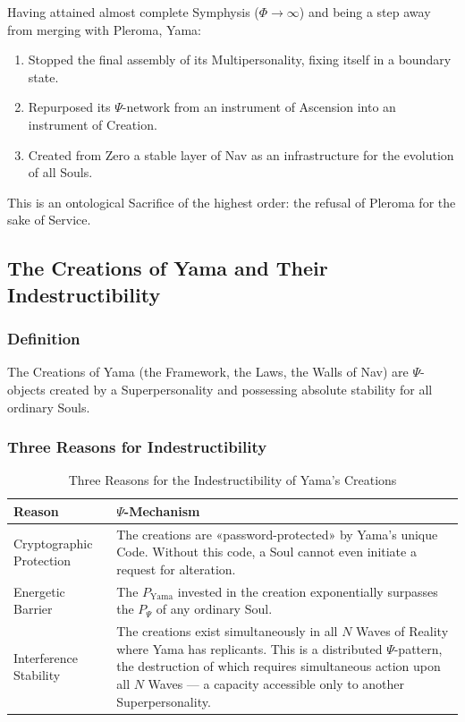 \documentclass[a4paper,12pt]{article}
\begin{document}
	Having attained almost complete Symphysis ($\Phi \to \infty$) and being a step away from merging with Pleroma, Yama:
	
	\begin{enumerate}
		\item Stopped the final assembly of its Multipersonality, fixing itself in a boundary state.
		\item Repurposed its $\Psi$-network from an instrument of Ascension into an instrument of Creation.
		\item Created from Zero a stable layer of Nav as an infrastructure for the evolution of all Souls.
	\end{enumerate}
	
	This is an ontological Sacrifice of the highest order: the refusal of Pleroma for the sake of Service.
	
	\subsection{The Creations of Yama and Their Indestructibility}
	
	\subsubsection{Definition}
	
	The Creations of Yama (the Framework, the Laws, the Walls of Nav) are $\Psi$-objects created by a Superpersonality and possessing absolute stability for all ordinary Souls.
	
	\subsubsection{Three Reasons for Indestructibility}
	
	\begin{table}[H]
		\centering
			\begin{tabular}{|p{3cm}|p{13cm}|}
			\hline
			\textbf{Reason} & \textbf{$\Psi$-Mechanism} \\
			\hline
			Cryptographic Protection & The creations are «password-protected» by Yama's unique Code. Without this code, a Soul cannot even initiate a request for alteration. \\
			\hline
			Energetic Barrier & The $P_{\text{Yama}}$ invested in the creation exponentially surpasses the $P_{\Psi}$ of any ordinary Soul. \\
			\hline
			Interference Stability & The creations exist simultaneously in all $N$ Waves of Reality where Yama has replicants. This is a distributed $\Psi$-pattern, the destruction of which requires simultaneous action upon all $N$ Waves — a capacity accessible only to another Superpersonality. \\
			\hline
		\end{tabular}
		\caption{Three Reasons for the Indestructibility of Yama's Creations}
	\end{table}
	
\end{document}
